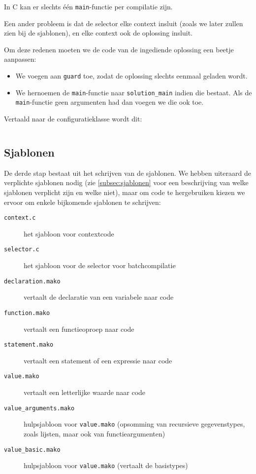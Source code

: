 In C kan er slechts één \texttt{main}-functie per compilatie zijn.

Een ander probleem is dat de selector elke context insluit (zoals we later zullen zien bij de sjablonen), en elke context ook de oplossing insluit.

Om deze redenen moeten we de code van de ingediende oplossing een beetje aanpassen:

\begin{itemize}
    \item We voegen aan \texttt{guard} toe, zodat de oplossing slechts eenmaal geladen wordt.
    \item We hernoemen de \texttt{main}-functie naar \texttt{solution\_main} indien die bestaat.
    Als de \texttt{main}-functie geen argumenten had dan voegen we die ook toe.
\end{itemize}

Vertaald naar de configuratieklasse wordt dit:

\inputminted[firstline=25,lastline=42,gobble=4]{python}{sources/c-config.py}

\subsection{Sjablonen}\label{subsec:manual-sjablonen}

De derde stap bestaat uit het schrijven van de sjablonen.
We hebben uiteraard de verplichte sjablonen nodig (zie \cref{subsec:sjablonen} voor een beschrijving van welke sjablonen verplicht zijn en welke niet), maar om code te hergebruiken kiezen we ervoor om enkele bijkomende sjablonen te schrijven:

\begin{description}
    \item[\texttt{context.c}] het sjabloon voor contextcode
    \item[\texttt{selector.c}] het sjabloon voor de selector voor batchcompilatie
    \item[\texttt{declaration.mako}] vertaalt de declaratie van een variabele naar code
    \item[\texttt{function.mako}] vertaalt een functieoproep naar code
    \item[\texttt{statement.mako}] vertaalt een statement of een expressie naar code
    \item[\texttt{value.mako}] vertaalt een letterlijke waarde naar code
    \item[\texttt{value\_arguments.mako}] hulpsjabloon voor \texttt{value.mako} (opsomming van recursieve gegevenstypes, zoals lijsten, maar ook van functieargumenten)
    \item[\texttt{value\_basic.mako}] hulpsjabloon voor \texttt{value.mako} (vertaalt de basistypes)
\end{description}


